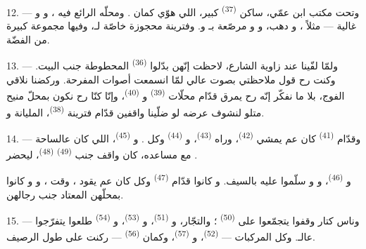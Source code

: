 12. --- وتحت مكتب ابن عمّي، ساكن 
\textsuperscript{(37)} كبير، اللي هوّي كمان . ومحلّه الرائع
فيه ،
و و غالية — مثلاً ،
و دهب، و و مرصّعة
بـ و. وفترينة محجوزة خاصّة
لـ، وفيها مجموعة كبيرة من 
الفضّة.

13. --- ولمّا لفّينا عند زاوية الشارع، لاحظت إنّهن بدّلوا
 \textsuperscript{(36)} المحطوطة جنب  البيت.
وكنت رح قول ملاحظتي بصوت عالي لمّا انسمعت أصوات 
المفرحة. وركضنا نلاقي الفوج، بلا ما نفكّر إنّه  رح يمرق
قدّام محلّات  \textsuperscript{(39)}
و \textsuperscript{(40)}، وإنّا كنّا رح نكون بمحلّ منيح
متلو لنشوف عرضه لو ضلّينا واقفين قدّام فترينة 
\textsuperscript{(38)}، المليانة 
و.

\VUsaut{3.0mm}

14. --- وقدّام  \textsuperscript{(41)} كان عم يمشي
 \textsuperscript{(42)}، وراه 
\textsuperscript{(43)}، و \textsuperscript{(44)} وكل
. و \textsuperscript{(45)}، اللي كان
عالساحة مع مساعده، كان واقف جنب 
\textsuperscript{(49)}  \textsuperscript{(48)}، ليحضر
.

و \textsuperscript{(46)}، و
و سلّموا عليه بالسيف. و كانوا قدّام
 \textsuperscript{(47)} وكل  كان عم يقود
، وقت ، و
و كانوا بمحلّهن المعتاد جنب رجالهن.

15. --- وناس كتار وقفوا يتجمّعوا على 
\textsuperscript{(50)} ؛ والتجّار، و
\textsuperscript{(51)}، و \textsuperscript{(53)}،
و \textsuperscript{(54)} طلعوا يتفرّجوا
عالـ. وكل المركبات — 
\textsuperscript{(52)}، و \textsuperscript{(57)}،
وكمان  \textsuperscript{(56)} — ركنت على طول الرصيف.

\VUsaut{3.0mm}

